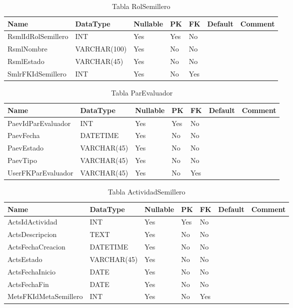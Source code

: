 \begin{table}
	\caption{Tabla RolSemillero}
	\label{labelTableRolSemillero}
	\begin{tabular}{ |l|l|l|l|l|l|l| }
		\hline
		Name & DataType & Nullable & PK & FK & Default & Comment \\ \hline
		RsmlIdRolSemillero & INT & Yes & Yes & No &  & \\ \hline 
		RsmlNombre & VARCHAR(100) & Yes & No & No &  & \\ \hline 
		RsmlEstado & VARCHAR(45) & Yes & No & No &  & \\ \hline 
		SmlrFKIdSemillero & INT & Yes & No & Yes &  & \\ \hline 
		
	\end{tabular}
\end{table}


\begin{table}
	\caption{Tabla ParEvaluador}
	\label{labelTableParEvaluador}
	\begin{tabular}{ |l|l|l|l|l|l|l| }
		\hline
		Name & DataType & Nullable & PK & FK & Default & Comment \\ \hline
		PaevIdParEvaluador & INT & Yes & Yes & No &  & \\ \hline 
		PaevFecha & DATETIME & Yes & No & No &  & \\ \hline 
		PaevEstado & VARCHAR(45) & Yes & No & No &  & \\ \hline 
		PaevTipo & VARCHAR(45) & Yes & No & No &  & \\ \hline 
		UserFKParEvaluador & VARCHAR(45) & Yes & No & Yes &  & \\ \hline 
		
	\end{tabular}
\end{table}


\begin{table}
	\caption{Tabla ActividadSemillero}
	\label{labelTableActividadSemillero}
	\begin{tabular}{ |l|l|l|l|l|l|l| }
		\hline
		Name & DataType & Nullable & PK & FK & Default & Comment \\ \hline
		ActsIdActividad & INT & Yes & Yes & No &  & \\ \hline 
		ActsDescripcion & TEXT & Yes & No & No &  & \\ \hline 
		ActsFechaCreacion & DATETIME & Yes & No & No &  & \\ \hline 
		ActsEstado & VARCHAR(45) & Yes & No & No &  & \\ \hline 
		ActsFechaInicio & DATE & Yes & No & No &  & \\ \hline 
		ActsFechaFin & DATE & Yes & No & No &  & \\ \hline 
		MetsFKIdMetaSemillero & INT & Yes & No & Yes &  & \\ \hline 
		
	\end{tabular}
\end{table}


